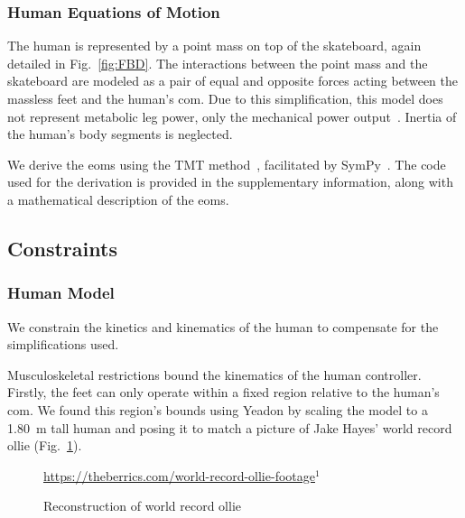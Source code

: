 \documentclass[default,iicol]{sn-jnl}
\begin{document}
\subsubsection{Human Equations of Motion}
The human is represented by a point mass on top of the skateboard, again detailed in Fig.~\ref{fig:FBD}.
The interactions between the point mass and the skateboard are modeled as a pair of equal and opposite forces acting between the massless feet and the human's \gls{com}.
Due to this simplification, this model does not represent metabolic leg power, only the mechanical power output~\cite{van_der_kruk_power_2018,morin_biomechanics_2018}. Inertia of the human's body segments is neglected.

We derive the \glspl{eom} using the TMT method~\cite{vallery_heike_advanced_2018}, facilitated by SymPy~\cite{meurer_sympy_2017}.
The code used for the derivation is provided in the supplementary information, along with a mathematical description of the \glspl{eom}.

\subsection{Constraints}

\subsubsection{Human Model}

We constrain the kinetics and kinematics of the human to compensate for the simplifications used.

Musculoskeletal restrictions bound the kinematics of the human controller.
Firstly, the feet can only operate within a fixed region relative to the human's \gls{com}.
We found this region's bounds using Yeadon \cite{yeadon_simulation_1990} by scaling the model to a \SI{1.80}{\meter} tall human and posing it to match a picture of Jake Hayes' world record ollie (Fig.~\ref{fig:f_record}). 

\begin{figure}
    \centering
    \quad
    \caption{Reconstruction of world record ollie} 
    \label{fig:f_record}
    \centering \footnotesize \url{https://theberrics.com/world-record-ollie-footage}$^{1}$%
\end{figure}
\end{document}
